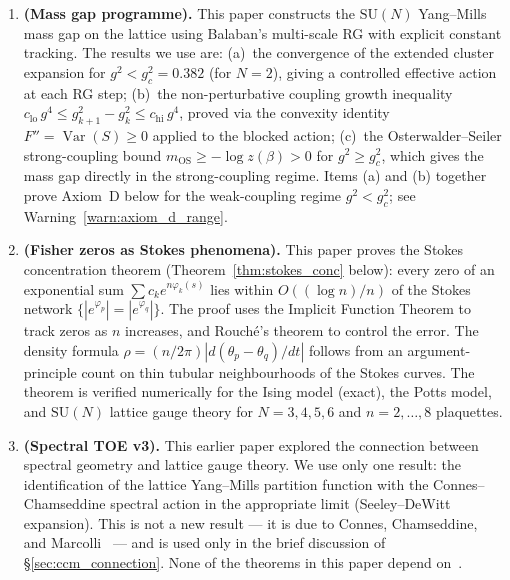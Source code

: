 \documentclass[12pt]{article}
\theoremstyle{definition}
\theoremstyle{remark}
\newcommand{\SU}{\mathrm{SU}}
\newcommand{\Var}{\operatorname{Var}}
\newcommand{\gB}{g^2_c}
\begin{document}
\begin{enumerate}
\item \textbf{\cite{Olbryk2026MG} (Mass gap programme).}
  This paper constructs the $\SU(N)$ Yang--Mills mass gap on the
  lattice using Balaban's multi-scale RG with explicit constant
  tracking.  The results we use are:
  (a)~the convergence of the extended cluster expansion for
  $g^2 < \gB = 0.382$ (for $N = 2$), giving a controlled effective
  action at each RG step;
  (b)~the non-perturbative coupling growth inequality
  $c_{\mathrm{lo}}\,g^4 \le g^2_{k+1} - g^2_k \le c_{\mathrm{hi}}\,g^4$,
  proved via the convexity identity $F'' = \Var(S) \ge 0$ applied to
  the blocked action;
  (c)~the Osterwalder--Seiler strong-coupling bound
  $m_{\mathrm{OS}} \ge -\log z(\beta) > 0$ for $g^2 \ge \gB$,
  which gives the mass gap directly in the strong-coupling regime.
  Items (a) and (b) together prove Axiom~D below for the
  weak-coupling regime $g^2 < \gB$; see Warning~\ref{warn:axiom_d_range}.

\item \textbf{\cite{OlbrykPsi2026} (Fisher zeros as Stokes phenomena).}
  This paper proves the Stokes concentration theorem
  (Theorem~\ref{thm:stokes_conc} below): every zero of an exponential
  sum $\sum c_k e^{n\varphi_k(s)}$ lies within $O((\log n)/n)$ of the
  Stokes network $\{|e^{\varphi_p}| = |e^{\varphi_q}|\}$.  The proof
  uses the Implicit Function Theorem to track zeros as $n$ increases,
  and Rouch\'e's theorem to control the error.  The density formula
  $\rho = (n/2\pi)|d(\theta_p - \theta_q)/dt|$ follows from an
  argument-principle count on thin tubular neighbourhoods of the Stokes
  curves.  The theorem is verified numerically for the Ising model
  (exact), the Potts model, and $\SU(N)$ lattice gauge theory for
  $N = 3, 4, 5, 6$ and $n = 2, \ldots, 8$ plaquettes.

\item \textbf{\cite{Olbryk2026v3} (Spectral TOE v3).}
  This earlier paper explored the connection between spectral
  geometry and lattice gauge theory.  We use only one result:
  the identification of the lattice Yang--Mills partition function
  with the Connes--Chamseddine spectral action in the appropriate
  limit (Seeley--DeWitt expansion).  This is not a new result ---
  it is due to Connes, Chamseddine, and Marcolli~\cite{CCM2007} ---
  and is used only in the brief discussion of
  \S\ref{sec:ccm_connection}.  None of the theorems in this paper
  depend on~\cite{Olbryk2026v3}.
\end{enumerate}
\end{document}
